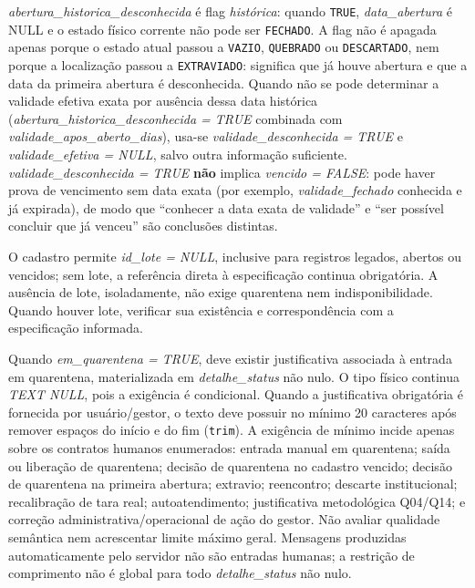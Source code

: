 \begin{explicacao}
\textit{abertura\_historica\_desconhecida} é flag \emph{histórica}: quando \texttt{TRUE}, \textit{data\_abertura} é NULL e o estado físico corrente não pode ser \texttt{FECHADO}. A flag não é apagada apenas porque o estado atual passou a \texttt{VAZIO}, \texttt{QUEBRADO} ou \texttt{DESCARTADO}, nem porque a localização passou a \texttt{EXTRAVIADO}: significa que já houve abertura e que a data da primeira abertura é desconhecida. Quando não se pode determinar a validade efetiva exata por ausência dessa data histórica (\textit{abertura\_historica\_desconhecida = TRUE} combinada com \textit{validade\_apos\_aberto\_dias}), usa-se \textit{validade\_desconhecida = TRUE} e \textit{validade\_efetiva = NULL}, salvo outra informação suficiente. \textit{validade\_desconhecida = TRUE} \textbf{não} implica \textit{vencido = FALSE}: pode haver prova de vencimento sem data exata (por exemplo, \textit{validade\_fechado} conhecida e já expirada), de modo que ``conhecer a data exata de validade'' e ``ser possível concluir que já venceu'' são conclusões distintas.
\end{explicacao}

\begin{regra}
O cadastro permite \textit{id\_lote = NULL}, inclusive para registros legados, abertos ou vencidos; sem lote, a referência direta à especificação continua obrigatória. A ausência de lote, isoladamente, não exige quarentena nem indisponibilidade. Quando houver lote, verificar sua existência e correspondência com a especificação informada.

Quando \textit{em\_quarentena = TRUE}, deve existir justificativa associada à entrada em quarentena, materializada em \textit{detalhe\_status} não nulo. O tipo físico continua \textit{TEXT NULL}, pois a exigência é condicional. Quando a justificativa obrigatória é fornecida por usuário/gestor, o texto deve possuir no mínimo 20 caracteres após remover espaços do início e do fim (\texttt{trim}). A exigência de mínimo incide apenas sobre os contratos humanos enumerados: entrada manual em quarentena; saída ou liberação de quarentena; decisão de quarentena no cadastro vencido; decisão de quarentena na primeira abertura; extravio; reencontro; descarte institucional; recalibração de tara real; autoatendimento; justificativa metodológica Q04/Q14; e correção administrativa/operacional de ação do gestor. Não avaliar qualidade semântica nem acrescentar limite máximo geral. Mensagens produzidas automaticamente pelo servidor não são entradas humanas; a restrição de comprimento não é global para todo \textit{detalhe\_status} não nulo.
\end{regra}

